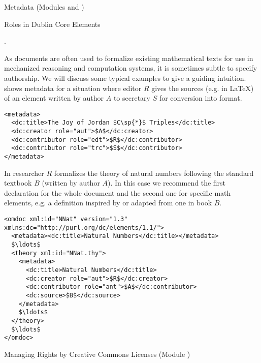 \begin{tchapter}[id=metadata,short=Metadata]{Metadata (Modules {} and  {})}
\begin{tsection}[id=dc-roles]{Roles in Dublin Core Elements}
\begin{description}
  {}.
\end{description}
As {\omdoc} documents are often used to formalize existing mathematical texts for use in
mechanized reasoning and computation systems, it is sometimes subtle to specify
authorship.  We will discuss some typical examples to give a guiding intuition.
{} shows metadata for a situation where editor $R$ gives the sources
(e.g. in {\LaTeX}) of an element written by author $A$ to secretary $S$ for conversion
into {\omdoc} format.
\begin{lstlisting}[label=lst:sec-edt,mathescape,
  caption={A Document with Editor ({\snippet{edt}}) and  Transcriber ({\snippet{trc}})},
  index={metadata,dc:title,dc:creator,dc:contributor}]
<metadata>
  <dc:title>The Joy of Jordan $C\sp{*}$ Triples</dc:title>
  <dc:creator role="aut">$A$</dc:creator>
  <dc:contributor role="edt">$R$</dc:contributor>
  <dc:contributor role="trc">$S$</dc:contributor>
</metadata>
\end{lstlisting}

In {} researcher $R$ formalizes the theory of natural numbers
following the standard textbook $B$ (written by author $A$). In this case we
recommend the first declaration for the whole document and the second one for
specific math elements, e.g. a definition inspired by or adapted from one in book
$B$.

\begin{lstlisting}[label=lst:formalize,mathescape,
  caption={A Formalization with Scientific Antecedent ({\snippet{ant}})},
  index={metadata,dc:title,dc:creator}]
<omdoc xml:id="NNat" version="1.3" xmlns:dc="http://purl.org/dc/elements/1.1/">
  <metadata><dc:title>Natural Numbers</dc:title></metadata>                              
  $\ldots$
  <theory xml:id="NNat.thy">
    <metadata>
      <dc:title>Natural Numbers</dc:title>
      <dc:creator role="aut">$R$</dc:creator>
      <dc:contributor role="ant">$A$</dc:contributor>
      <dc:source>$B$</dc:source>
    </metadata>
    $\ldots$
  </theory>
  $\ldots$
</omdoc>
\end{lstlisting}
\end{tsection}

\begin{tsection}[id=creativecommons,short=Managing Rights]{Managing Rights by Creative
    Commons Licenses (Module {})}


\end{tsection}
\end{tchapter}

